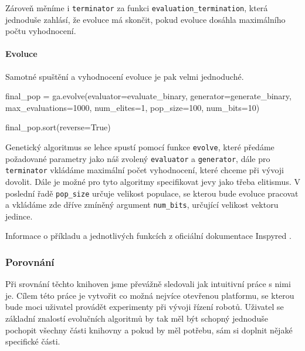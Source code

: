 Zároveň měníme i \texttt{terminator} za funkci \texttt{evaluation\_termination},
která jednoduše zahlásí, že evoluce má skončit, pokud evoluce dosáhla
maximálního počtu vyhodnocení.

\paragraph{Evoluce}
Samotné spuštění a vyhodnocení evoluce je pak velmi jednoduché.

\begin{code}
final_pop = ga.evolve(evaluator=evaluate_binary,
                      generator=generate_binary,
                      max_evaluations=1000,
                      num_elites=1,
                      pop_size=100,
                      num_bits=10)

final_pop.sort(reverse=True)
\end{code}

Genetický algoritmus se lehce spustí pomocí funkce \texttt{evolve}, které předáme
požadované parametry jako náš zvolený \texttt{evaluator} a \texttt{generator},
dále pro \texttt{terminator} vkládáme maximální počet vyhodnocení, které chceme
při vývoji dovolit. Dále je možné pro tyto algoritmy specifikovat jevy jako
třeba elitismus. V poslední řadě \texttt{pop\_size} určuje velikost populace,
se kterou bude evoluce pracovat a vkládáme zde dříve zmíněný argument
\texttt{num\_bits}, určující velikost vektoru jedince. 

Informace o příkladu a jednotlivých funkcích z oficiální dokumentace Inspyred
\citep{InspyredDocs}.


\subsubsection{Porovnání} \label{GA - Porovnání}
Při srovnání těchto knihoven jsme převážně sledovali jak intuitivní práce s
nimi je. Cílem této práce je vytvořit co možná nejvíce otevřenou platformu, se
kterou bude moci uživatel provádět experimenty při vývoji řízení robotů.
Uživatel se základní znalostí evolučních algoritmů by tak měl být schopný
jednoduše pochopit všechny části knihovny a pokud by měl potřebu, sám si
doplnit nějaké specifické části. 

